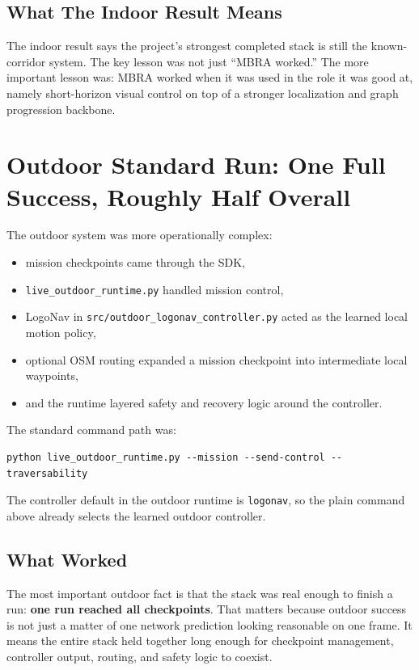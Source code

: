 \documentclass[11pt]{article}
\begin{document}
\subsection{What The Indoor Result Means}

The indoor result says the project's strongest completed stack is still the
known-corridor system. The key lesson was not just ``MBRA worked.'' The more
important lesson was: MBRA worked when it was used in the role it was good at,
namely short-horizon visual control on top of a stronger localization and graph
progression backbone.

\section{Outdoor Standard Run: One Full Success, Roughly Half Overall}

The outdoor system was more operationally complex:

\begin{itemize}[nosep]
  \item mission checkpoints came through the SDK,
  \item \texttt{live\_outdoor\_runtime.py} handled mission control,
  \item LogoNav in \texttt{src/outdoor\_logonav\_controller.py} acted as the learned
  local motion policy,
  \item optional OSM routing expanded a mission checkpoint into intermediate local
  waypoints,
  \item and the runtime layered safety and recovery logic around the controller.
\end{itemize}

The standard command path was:

\begin{verbatim}
python live_outdoor_runtime.py --mission --send-control --traversability
\end{verbatim}

The controller default in the outdoor runtime is \texttt{logonav}, so the plain
command above already selects the learned outdoor controller.

\subsection{What Worked}

The most important outdoor fact is that the stack was real enough to finish a run:
\textbf{one run reached all checkpoints}. That matters because outdoor success is
not just a matter of one network prediction looking reasonable on one frame. It
means the entire stack held together long enough for checkpoint management,
controller output, routing, and safety logic to coexist.
\end{document}
